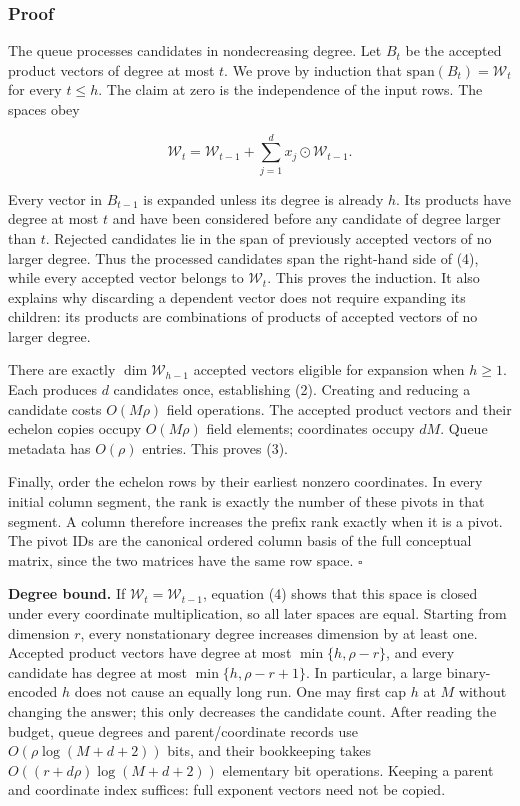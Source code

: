 \hypertarget{af-4b125c3959-proof}{%
\subsubsection{Proof}\label{af-4b125c3959-proof}}

The queue processes candidates in nondecreasing degree. Let \(B_t\) be the accepted product vectors of degree at most \(t\). We prove by induction that \(\mathrm{span}(B_t)=\mathcal W_t\) for every \(t\le h\). The claim at zero is the independence of the input rows. The spaces obey

\[
\mathcal W_t=\mathcal W_{t-1}
       +\sum_{j=1}^d x_j\odot\mathcal W_{t-1}.
\tag{4}
\]

Every vector in \(B_{t-1}\) is expanded unless its degree is already \(h\). Its products have degree at most \(t\) and have been considered before any candidate of degree larger than \(t\). Rejected candidates lie in the span of previously accepted vectors of no larger degree. Thus the processed candidates span the right-hand side of (4), while every accepted vector belongs to \(\mathcal W_t\). This proves the induction. It also explains why discarding a dependent vector does not require expanding its children: its products are combinations of products of accepted vectors of no larger degree.

There are exactly \(\dim\mathcal W_{h-1}\) accepted vectors eligible for expansion when \(h\ge1\). Each produces \(d\) candidates once, establishing (2). Creating and reducing a candidate costs \(O(M\rho)\) field operations. The accepted product vectors and their echelon copies occupy \(O(M\rho)\) field elements; coordinates occupy \(dM\). Queue metadata has \(O(\rho)\) entries. This proves (3).

Finally, order the echelon rows by their earliest nonzero coordinates. In every initial column segment, the rank is exactly the number of these pivots in that segment. A column therefore increases the prefix rank exactly when it is a pivot. The pivot IDs are the canonical ordered column basis of the full conceptual matrix, since the two matrices have the same row space. \(\square\)

\textbf{Degree bound.} If \(\mathcal W_t=\mathcal W_{t-1}\), equation (4) shows that this space is closed under every coordinate multiplication, so all later spaces are equal. Starting from dimension \(r\), every nonstationary degree increases dimension by at least one. Accepted product vectors have degree at most \(\min\{h,\rho-r\}\), and every candidate has degree at most \(\min\{h,\rho-r+1\}\). In particular, a large binary-encoded \(h\) does not cause an equally long run. One may first cap \(h\) at \(M\) without changing the answer; this only decreases the candidate count. After reading the budget, queue degrees and parent/coordinate records use \(O(\rho\log(M+d+2))\) bits, and their bookkeeping takes \(O((r+d\rho)\log(M+d+2))\) elementary bit operations. Keeping a parent and coordinate index suffices: full exponent vectors need not be copied.

